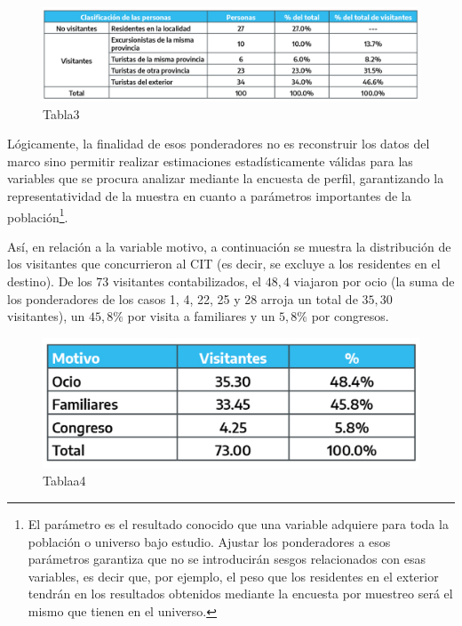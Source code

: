\documentclass[
]{book}
\begin{document}
\begin{figure}

{\centering \includegraphics[width=1\linewidth]{imagenes/tabla_3} 

}

\caption{Tabla3}\label{fig:Clasificaciondepersonas}
\end{figure}

Lógicamente, la finalidad de esos ponderadores no es reconstruir los datos del marco sino permitir realizar estimaciones estadísticamente válidas para las variables que se procura analizar mediante la encuesta de perfil, garantizando la representatividad de la muestra en cuanto a parámetros importantes de la población\footnote{El parámetro es el resultado conocido que una variable adquiere para toda la población o universo bajo estudio. Ajustar los ponderadores a esos parámetros garantiza que no se introducirán sesgos relacionados con esas variables, es decir que, por ejemplo, el peso que los residentes en el exterior tendrán en los resultados obtenidos mediante la encuesta por muestreo será el mismo que tienen en el universo.}.

Así, en relación a la variable motivo, a continuación se muestra la distribución de los visitantes que concurrieron al CIT (es decir, se excluye a los residentes en el destino). De los 73 visitantes contabilizados, el \(48,4%
\) viajaron por ocio (la suma de los ponderadores de los casos 1, 4, 22, 25 y 28 arroja un total de \(35,30\) visitantes), un \(45,8\%\) por visita a familiares y un \(5,8\%\) por congresos.

\begin{figure}

{\centering \includegraphics[width=1\linewidth]{imagenes/tabla_a4} 

}

\caption{Tablaa4}\label{fig:Motivo}
\end{figure}
\end{document}
